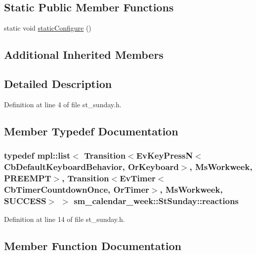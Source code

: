 \subsection*{Static Public Member Functions}
\begin{DoxyCompactItemize}
\item 
static void \hyperlink{structsm__calendar__week_1_1StSunday_ac9d8f202395f72b238783630e8c1d2f2}{static\+Configure} ()
\end{DoxyCompactItemize}
\subsection*{Additional Inherited Members}


\subsection{Detailed Description}


Definition at line 4 of file st\+\_\+sunday.\+h.



\subsection{Member Typedef Documentation}
\subsubsection[{\texorpdfstring{reactions}{reactions}}]{\setlength{\rightskip}{0pt plus 5cm}typedef mpl\+::list$<$ Transition$<$Ev\+Key\+PressN$<$Cb\+Default\+Keyboard\+Behavior, {\bf Or\+Keyboard}$>$, {\bf Ms\+Workweek}, {\bf P\+R\+E\+E\+M\+PT}$>$, Transition$<$Ev\+Timer$<$Cb\+Timer\+Countdown\+Once, {\bf Or\+Timer}$>$, {\bf Ms\+Workweek}, {\bf S\+U\+C\+C\+E\+SS}$>$ $>$ {\bf sm\+\_\+calendar\+\_\+week\+::\+St\+Sunday\+::reactions}}\hypertarget{structsm__calendar__week_1_1StSunday_af2828352a507a4c972e43b318bb59a51}{}\label{structsm__calendar__week_1_1StSunday_af2828352a507a4c972e43b318bb59a51}


Definition at line 14 of file st\+\_\+sunday.\+h.



\subsection{Member Function Documentation}
